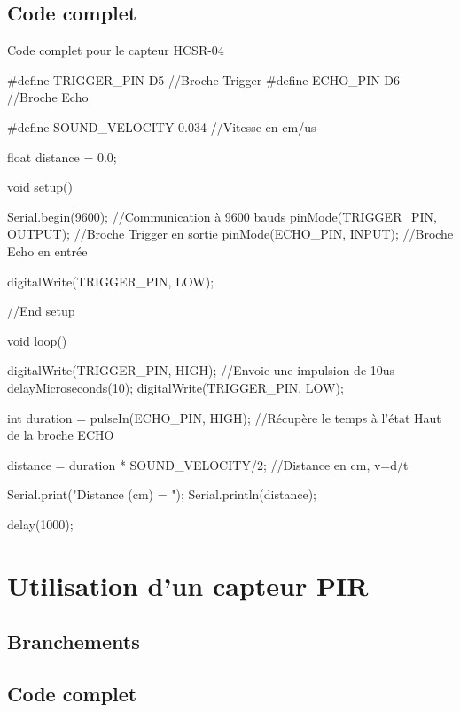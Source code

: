 
\subsection{Code complet}

\begin{Cpp}{Code complet pour le capteur HCSR-04}

#define TRIGGER_PIN D5  //Broche Trigger
#define ECHO_PIN D6     //Broche Echo

#define SOUND_VELOCITY 0.034 //Vitesse en cm/us

float distance = 0.0;

void setup() {

  Serial.begin(9600);         //Communication à 9600 bauds
  pinMode(TRIGGER_PIN, OUTPUT); //Broche Trigger en sortie
  pinMode(ECHO_PIN, INPUT);     //Broche Echo en entrée

  digitalWrite(TRIGGER_PIN, LOW);

}//End setup

void loop() {

  digitalWrite(TRIGGER_PIN, HIGH); //Envoie une impulsion de 10us
  delayMicroseconds(10);
  digitalWrite(TRIGGER_PIN, LOW);
  
  int duration = pulseIn(ECHO_PIN, HIGH); //Récupère le temps à l'état Haut de la broche ECHO

  distance = duration * SOUND_VELOCITY/2; //Distance en cm, v=d/t

  Serial.print("Distance (cm) = ");
  Serial.println(distance);
  
  delay(1000);
}

\end{Cpp}


\section{Utilisation d'un capteur PIR}

\subsection{Branchements}


\subsection{Code complet}

